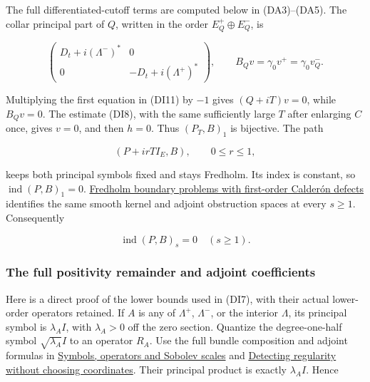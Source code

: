 \documentclass[
  11pt,
]{article}
\makeatletter
\let\ReaderOriginalAnchorStart\hyper@anchorstart
\let\ReaderOriginalAnchorEnd\hyper@anchorend
\let\ReaderPendingAliases\@empty
\def\ReaderArmAliases#1{\gdef\ReaderPendingAliases{#1}}
\def\hyper@anchorstart#1{\ReaderIfNativeAnchorTF{#1}{\ReaderPendingAliases\global\let\ReaderPendingAliases\@empty}{}\ReaderOriginalAnchorStart{#1}}
\makeatother
\begin{document}
The full differentiated-cutoff terms are computed below in (DA3)--(DA5).
The collar principal part of \(Q\), written in the order
\(E_Q^+\oplus E_Q^-\), is

\[
 \begin{pmatrix}
  D_t+i(\Lambda^-)^*&0\\
 0&-D_t+i(\Lambda^+)^*
 \end{pmatrix},\qquad
 B_Qv=\gamma_0v^+=\gamma_0v_Q^-.
 \tag{DI13}
\]

Multiplying the first equation in (DI11) by \(-1\) gives \((Q+iT)v=0\),
while \(B_Qv=0\). The estimate (DI8), with the same sufficiently large
\(T\) after enlarging \(C\) once, gives \(v=0\), and then \(h=0\). Thus
\((P_T,B)_1\) is bijective. The path

\[
 (P+i rT I_E,B),\qquad 0\leq r\leq1,
 \tag{DI14}
\]

keeps both principal symbols fixed and stays Fredholm. Its index is
constant, so \(\operatorname{ind}(P,B)_1=0\).
\href{generalized-collar-fredholm.pdf}{Fredholm boundary problems with
first-order Calderón defects} identifies the same smooth kernel and
adjoint obstruction spaces at every \(s\geq1\). Consequently

\[
 \boxed{\operatorname{ind}(P,B)_s=0\quad(s\geq1).}
 \tag{DI15}
\]

\ReaderArmAliases{\ReaderOriginalAnchorStart{AN03-SDI-ADJOINT-001}\ReaderOriginalAnchorEnd\begingroup\expandafter\def\csname @currentHref\endcsname{AN03-SDI-ADJOINT-001}\label{AN03-SDI-ADJOINT-001}\endgroup\ReaderOriginalAnchorStart{the-full-positivity-remainder-and-adjoint-coefficients}\ReaderOriginalAnchorEnd}
\subsubsection{The full positivity remainder and adjoint
coefficients}\label{the-full-positivity-remainder-and-adjoint-coefficients}

Here is a direct proof of the lower bounds used in (DI7), with their
actual lower-order operators retained. If \(A\) is any of \(\Lambda^+\),
\(\Lambda^-\), or the interior \(\Lambda\), its principal symbol is
\(\lambda_A I\), with \(\lambda_A>0\) off the zero section. Quantize the
degree-one-half symbol \(\sqrt{\lambda_A}I\) to an operator \(R_A\). Use
the full bundle composition and adjoint formulas in
\href{euclidean-symbol-calculus.pdf}{Symbols, operators and Sobolev
scales} and \href{geometric-microlocal-calculus.pdf}{Detecting regularity
without choosing coordinates}. Their principal product is exactly
\(\lambda_A I\). Hence
\end{document}
